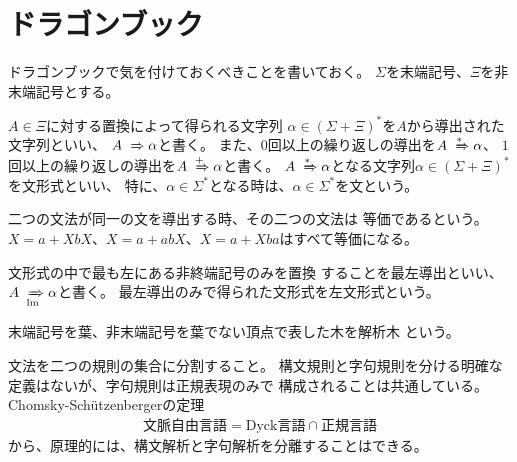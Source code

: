 \section{ドラゴンブック}\label{s1:ドラゴンブック} %
	ドラゴンブックで気を付けておくべきことを書いておく。
	$\Sigma$を末端記号、$\Xi$を非末端記号とする。
	\begin{description}\setlength{\itemsep}{-1mm} %
		\item[導出と文形式] $A\in\Xi$に対する置換によって得られる文字列
		$\alpha\in(\Sigma+\Xi)^*$を$A$から導出された文字列といい、
		$A\eqto{}{}\alpha$と書く。
		また、$0$回以上の繰り返しの導出を$A\eqto{*}{}\alpha$、
		$1$回以上の繰り返しの導出を$A\eqto{+}{}\alpha$と書く。
		$A\eqto{*}{}\alpha$となる文字列$\alpha\in(\Sigma+\Xi)^*$を文形式といい、
		特に、$\alpha\in\Sigma^*$となる時は、$\alpha\in\Sigma^*$を文という。
		\item[文法の同値性] 二つの文法が同一の文を導出する時、その二つの文法は
		等価であるという。$X=a+XbX$、$X=a+abX$、$X=a+Xba$はすべて等価になる。
		\item[最左導出と左文形式] 文形式の中で最も左にある非終端記号のみを置換
		することを最左導出といい、$A\eqto[\op{lm}]{}\alpha$と書く。
		最左導出のみで得られた文形式を左文形式という。
		\item[解析木] 末端記号を葉、非末端記号を葉でない頂点で表した木を解析木
		という。
		\item[構文規則と字句規則] 文法を二つの規則の集合に分割すること。
		構文規則と字句規則を分ける明確な定義はないが、字句規則は正規表現のみで
		構成されることは共通している。Chomsky-Schützenbergerの定理
		\begin{equation*}\begin{split}
			\text{文脈自由言語} = \text{Dyck言語}\cap\text{正規言語}
		\end{split}\end{equation*}
		から、原理的には、構文解析と字句解析を分離することはできる。
	\end{description} %
